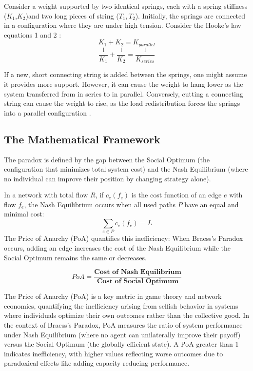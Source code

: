 \documentclass[twocolumn]{article}
\begin{document}
Consider a weight supported by two identical springs, each with a spring stiffness ($K_1$,$K_2$)and two long pieces of string ($T_1, T_2$). Initially, the springs are connected in a configuration where they are under high tension. Consider the Hooke's law equations 1 and 2 \cite{hooke1678spring}:
\begin{equation}
	K_1+K_2=K_{parallel} 
\end{equation}
\begin{equation}
	\frac{1}{K_1}+\frac{1}{K_2}=\frac{1}{K_{{series}}}
\end{equation}

If a new, short connecting string is added between the springs, one might assume it provides more support. However, it can cause the weight to hang lower as the system transferred from in series to in parallel. Conversely, cutting a connecting string can cause the weight to rise, as the load redistribution forces the springs into a parallel configuration \cite{penchina2003braess}. 

\subsection{The Mathematical Framework}
The paradox is defined by the gap between the {Social Optimum} (the configuration that minimizes total system cost) and the {Nash Equilibrium} (where no individual can improve their position by changing strategy alone).

In a network with total flow $R$, if $c_e(f_e)$ is the cost function of an edge $e$ with flow $f_e$, the Nash Equilibrium occurs when all used paths $P$ have an equal and minimal cost:
\begin{equation}
\sum_{e \in P} c_e(f_e) = L
\end{equation}
The {Price of Anarchy} (PoA) quantifies this inefficiency:
When Braess's Paradox occurs, adding an edge increases the cost of the Nash Equilibrium while the Social Optimum remains the same or decreases.

\begin{equation}
	PoA = \frac{\textbf{Cost of Nash Equilibrium}}{\textbf{Cost of Social Optimum}}
\end{equation}

The Price of Anarchy (PoA) is a key metric in game theory and network economics, quantifying the inefficiency arising from selfish behavior in systems where individuals optimize their own outcomes rather than the collective good. In the context of Braess's Paradox, PoA measures the ratio of system performance under Nash Equilibrium (where no agent can unilaterally improve their payoff) versus the Social Optimum (the globally efficient state). A PoA greater than 1 indicates inefficiency, with higher values reflecting worse outcomes due to paradoxical effects like adding capacity reducing performance.
\end{document}
